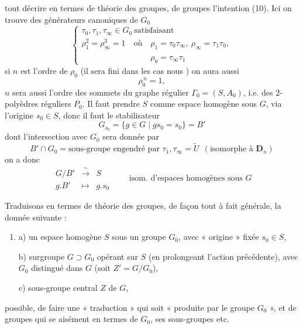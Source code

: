 \documentclass[11pt,a4paper]{article}
\begin{document}
tout décrire en termes de théorie des groupes, \struck{\ill{}}  de groupes \ill{} l'intention (10). Ici on trouve des générateurs canoniques de $G_0$
\[
\left\{
\begin{array}{l}
\tau_0,\tau_1,\tau_\infty\in G_0 \ \text{satisfaisant}\\
\rho_1^2=\rho_\infty^3=1 \quad\text{où}\quad \rho_1=\tau_0\tau_\infty,\ \rho_\infty=\tau_1\tau_0,\\
\phantom{\rho_1^2=\rho_\infty^3=1 \quad\text{où}\quad} \rho_0=\tau_\infty\tau_1
\end{array}\right. \tag{21}
\]
si $n$ est l'ordre de $\rho_0$ (il sera fini dans les cas  nous ) on aura aussi
\[
\rho_0^{\,n}=1 , \tag{22}
\]
$n$ sera aussi l'ordre des sommets du graphe régulier $\Gamma_0=(S,A_0)$, i.e. des 2-polyèdres réguliers $P_0$. Il faut  prendre $S$ comme espace homogène sous $G$, via l'origine $s_0\in S$, donc il faut  le stabilisateur
\[
G_{s_0}=\{g\in G\mid gs_0=s_0\}=B' \tag{23}
\]
dont l'intersection avec $G_0$ sera donnée par
\[
B'\cap G_0 = \text{sous-groupe engendré par } \tau_1,\tau_\infty = \tilde{U}\ \ (\text{isomorphe à } \mathbf{D}_n) \tag{24}
\]
on a donc
\[
\begin{array}{rcl}
G/B' & \xrightarrow{\ \sim\ } & S\\
g.B' & \longmapsto & g.s_0
\end{array}
\qquad\text{isom. d'espaces homogènes sous } G \tag{25}
\]



Traduisons en termes de théorie des groupes, de façon tout à fait générale, la donnée suivante :
\begin{enumerate}
\item[(26)] a) un espace homogène $S$ sous un groupe $G_0$, avec « origine » fixée $s_0\in S$,

b) surgroupe $G\supset G_0$ opérant sur $S$ (en prolongeant l'action précédente), avec $G_0$ distingué dans $G$ (soit $Z'=G/G_0$),

c) sous-groupe central $Z$ de $G$,
\end{enumerate}
   possible, de faire une « traduction » qui soit « produite par le groupe $G_0$ », et de groupes qui se  aisément en termes de $G_0$, \struck{\ill{}} ses sous-groupes etc.
\end{document}
